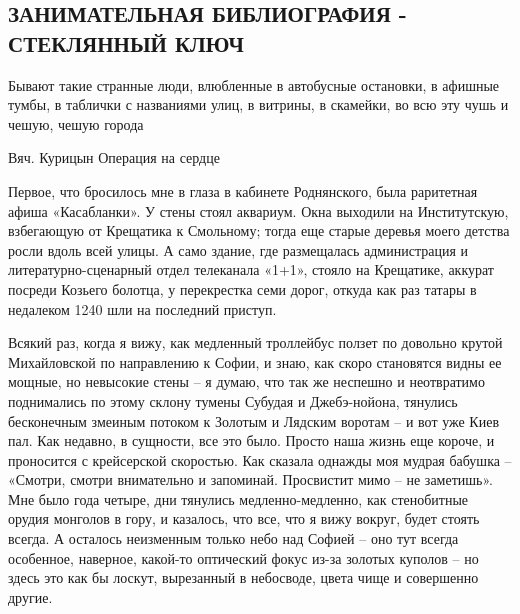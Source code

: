  
 
 
 
 
\subsection{ЗАНИМАТЕЛЬНАЯ БИБЛИОГРАФИЯ - СТЕКЛЯННЫЙ КЛЮЧ}
\label{sec:24_11_2018.lj.ugryumova.1.stekljannyj_kljuch}


\begin{zznagolos}
Бывают такие странные люди, влюбленные в автобусные остановки, в афишные тумбы,
в таблички с названиями улиц, в витрины, в скамейки, во всю эту чушь и чешую,
чешую города

Вяч. Курицын Операция на сердце
\end{zznagolos}

Первое, что бросилось мне в глаза в кабинете Роднянского, была раритетная афиша
«Касабланки». У стены стоял аквариум. Окна выходили на Институтскую, взбегающую
от Крещатика к Смольному; тогда еще старые деревья моего детства росли вдоль
всей улицы. А само здание, где размещалась администрация и
литературно-сценарный отдел телеканала «1+1», стояло на Крещатике, аккурат
посреди Козьего болотца, у перекрестка семи дорог, откуда как раз татары в
недалеком 1240 шли на последний приступ.


Всякий раз, когда я вижу, как медленный троллейбус ползет по довольно крутой
Михайловской по направлению к Софии, и знаю, как скоро становятся видны ее
мощные, но невысокие стены – я думаю, что так же неспешно и неотвратимо
поднимались по этому склону тумены Субудая и Джебэ-нойона, тянулись бесконечным
змеиным потоком к Золотым и Лядским воротам – и вот уже Киев пал. Как недавно,
в сущности, все это было. Просто наша жизнь еще короче, и проносится с
крейсерской скоростью. Как сказала однажды моя мудрая бабушка – «Смотри, смотри
внимательно и запоминай. Просвистит мимо – не заметишь». Мне было года четыре,
дни тянулись медленно-медленно, как стенобитные орудия монголов в гору, и
казалось, что все, что я вижу вокруг, будет стоять всегда. А осталось
неизменным только небо над Софией – оно тут всегда особенное, наверное,
какой-то оптический фокус из-за золотых куполов – но здесь это как бы лоскут,
вырезанный в небосводе, цвета чище и совершенно другие.


